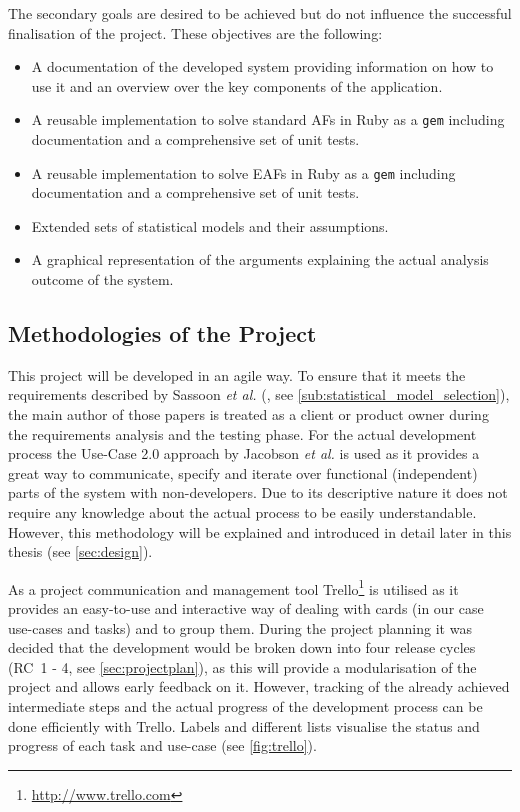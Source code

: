 \bigskip

The secondary goals are desired to be achieved but do not influence the successful finalisation of the project. These objectives are the following:

\begin{itemize}
	\item A documentation of the developed system providing information on how to use it and an overview over the key components of the application.
	\item A reusable implementation to solve standard \glspl{AF} in Ruby as a \texttt{gem} including documentation and a comprehensive set of unit tests.
	\item A reusable implementation to solve \glspl{EAF} in Ruby as a \texttt{gem} including documentation and a comprehensive set of unit tests.
	\item Extended sets of statistical models and their assumptions.
	\item A graphical representation of the arguments explaining the actual analysis outcome of the system.
\end{itemize}


\subsection{Methodologies of the Project}
\label{sub:methodologies}
This project will be developed in an agile way. To ensure that it meets the requirements described by Sassoon \textit{et al.} (\cite{sassoon2016,sassoon2014, sassoon2016CD}, see \autoref{sub:statistical_model_selection}), the main author of those papers is treated as a client or \gls{product owner} during the requirements analysis and the testing phase. For the actual development process the Use-Case 2.0 approach by Jacobson \textit{et al.} \cite{jacobson2011usecase} is used as it provides a great way to communicate, specify and iterate over functional (independent) parts of the system with non-developers. Due to its descriptive nature it does not require any knowledge about the actual process to be easily understandable. However, this methodology will be explained and introduced in detail later in this thesis (see \autoref{sec:design}). 

As a project communication and management tool Trello\footnote{\url{http://www.trello.com}} is utilised as it provides an easy-to-use and interactive way of dealing with cards (in our case use-cases and tasks) and to group them. During the project planning it was decided that the development would be broken down into four release cycles (RC~1 - 4, see \autoref{sec:projectplan}), as this will provide a modularisation of the project and allows early feedback on it. However, tracking of the already achieved intermediate steps and the actual progress of the development process can be done efficiently with Trello. Labels and different lists visualise the status and progress of each task and use-case (see \autoref{fig:trello}).



